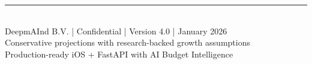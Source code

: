 \documentclass[11pt,a4paper]{report}
\begin{document}
\vspace{1.5cm}

\begin{center}
    \textcolor{freegray}{\rule{12cm}{0.5pt}}\\[0.4cm]
    \textcolor{freegray}{\small DeepmAInd B.V. | Confidential | Version 4.0 | January 2026}\\[0.2cm]
    \textcolor{freegray}{\scriptsize Conservative projections with research-backed growth assumptions}\\
    \textcolor{freegray}{\scriptsize Production-ready iOS + FastAPI with AI Budget Intelligence}
\end{center}
\end{document}
